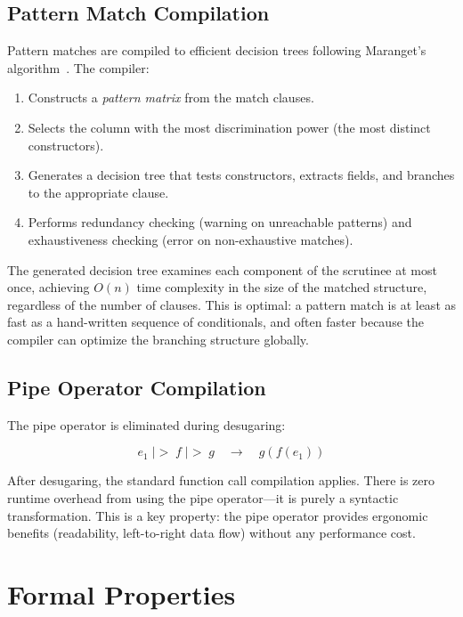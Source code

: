 \documentclass[11pt,a4paper]{article}
\newcommand{\pipe}{\;|\!>\;}
\begin{document}
\subsection{Pattern Match Compilation}

Pattern matches are compiled to efficient decision trees following Maranget's algorithm~\citep{maranget2008compiling}. The compiler:

\begin{enumerate}
  \item Constructs a \emph{pattern matrix} from the match clauses.
  \item Selects the column with the most discrimination power (the most distinct constructors).
  \item Generates a decision tree that tests constructors, extracts fields, and branches to the appropriate clause.
  \item Performs redundancy checking (warning on unreachable patterns) and exhaustiveness checking (error on non-exhaustive matches).
\end{enumerate}

The generated decision tree examines each component of the scrutinee at most once, achieving $O(n)$ time complexity in the size of the matched structure, regardless of the number of clauses. This is optimal: a pattern match is at least as fast as a hand-written sequence of conditionals, and often faster because the compiler can optimize the branching structure globally.

\subsection{Pipe Operator Compilation}

The pipe operator is eliminated during desugaring:

\[
e_1 \pipe f \pipe g \quad\longrightarrow\quad g(f(e_1))
\]

After desugaring, the standard function call compilation applies. There is zero runtime overhead from using the pipe operator---it is purely a syntactic transformation. This is a key property: the pipe operator provides ergonomic benefits (readability, left-to-right data flow) without any performance cost.


\section{Formal Properties}
\label{sec:formal-properties}
\end{document}
